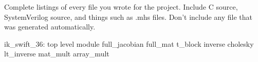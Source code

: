 Complete listings of every file you wrote for the project. Include C source, SystemVerilog source, and things such as .mhs files. Don't include any file that was generated automatically.

ik_swift_36: top level module
	full_jacobian
		full_mat
			t_block
	inverse
		cholesky
		lt_inverse
	mat_mult
	array_mult